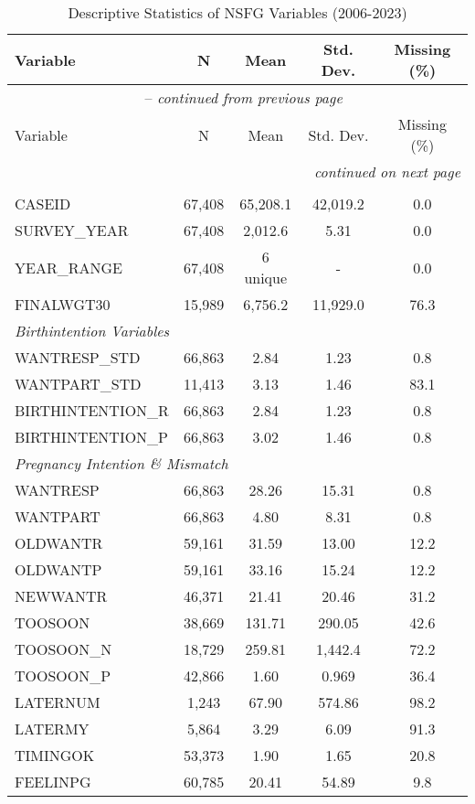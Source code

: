 \begin{longtable}{lcccc}
\caption{Descriptive Statistics of NSFG Variables (2006-2023)}\label{tab:descriptive_stats}
\hline
Variable & N & Mean & Std. Dev. & Missing (\%) \\
\hline
\endfirsthead
\multicolumn{5}{c}{\tablename\ \thetable{} -- \textit{continued from previous page}} \\
\hline
Variable & N & Mean & Std. Dev. & Missing (\%) \\
\hline
\endhead
\hline
\multicolumn{5}{r}{\textit{continued on next page}} \\
\endfoot
\hline
\endlastfoot
\multicolumn{5}{l}{\textit{ID \& Time Variables}} \\
CASEID & 67,408 & 65,208.1 & 42,019.2 & 0.0 \\
SURVEY_YEAR & 67,408 & 2,012.6 & 5.31 & 0.0 \\
YEAR_RANGE & 67,408 & 6 unique & - & 0.0 \\
FINALWGT30 & 15,989 & 6,756.2 & 11,929.0 & 76.3 \\
\hline
\multicolumn{5}{l}{\textit{Birthintention Variables}} \\
WANTRESP_STD & 66,863 & 2.84 & 1.23 & 0.8 \\
WANTPART_STD & 11,413 & 3.13 & 1.46 & 83.1 \\
BIRTHINTENTION_R & 66,863 & 2.84 & 1.23 & 0.8 \\
BIRTHINTENTION_P & 66,863 & 3.02 & 1.46 & 0.8 \\
\hline
\multicolumn{5}{l}{\textit{Pregnancy Intention \& Mismatch}} \\
WANTRESP & 66,863 & 28.26 & 15.31 & 0.8 \\
WANTPART & 66,863 & 4.80 & 8.31 & 0.8 \\
OLDWANTR & 59,161 & 31.59 & 13.00 & 12.2 \\
OLDWANTP & 59,161 & 33.16 & 15.24 & 12.2 \\
NEWWANTR & 46,371 & 21.41 & 20.46 & 31.2 \\
TOOSOON & 38,669 & 131.71 & 290.05 & 42.6 \\
TOOSOON_N & 18,729 & 259.81 & 1,442.4 & 72.2 \\
TOOSOON_P & 42,866 & 1.60 & 0.969 & 36.4 \\
LATERNUM & 1,243 & 67.90 & 574.86 & 98.2 \\
LATERMY & 5,864 & 3.29 & 6.09 & 91.3 \\
TIMINGOK & 53,373 & 1.90 & 1.65 & 20.8 \\
FEELINPG & 60,785 & 20.41 & 54.89 & 9.8 \\

\end{longtable}
